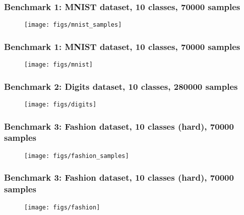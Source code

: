 \documentclass[aspectratio=169]{beamer}
\begin{document}
\begin{frame}
    \frametitle{Benchmark 1: MNIST dataset, 10 classes, 70000 samples}
    \begin{figure}
        \centering
        \texttt{[image: figs/mnist\_samples]}
    \end{figure}
\end{frame}
\begin{frame}
    \frametitle{Benchmark 1: MNIST dataset, 10 classes, 70000 samples}
    \begin{figure}
        \centering
        \texttt{[image: figs/mnist]}
    \end{figure}
\end{frame}
\begin{frame}
    \frametitle{Benchmark 2: Digits dataset, 10 classes, 280000 samples}
    \begin{figure}
        \centering
        \texttt{[image: figs/digits]}
    \end{figure}
\end{frame}
\begin{frame}
    \frametitle{Benchmark 3: Fashion dataset, 10 classes (hard), 70000 samples}
    \begin{figure}
        \centering
        \texttt{[image: figs/fashion\_samples]}
    \end{figure}
\end{frame}
\begin{frame}
    \frametitle{Benchmark 3: Fashion dataset, 10 classes (hard), 70000 samples}
    \begin{figure}
        \centering
        \texttt{[image: figs/fashion]}
    \end{figure}
\end{frame}
\end{document}
